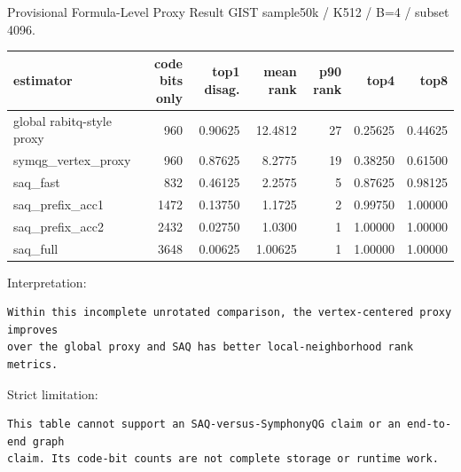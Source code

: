 \documentclass[aspectratio=169,10pt]{beamer}
\begin{document}
\begin{frame}[fragile]{Provisional Formula-Level Proxy Result}
\scriptsize
GIST sample50k / K512 / B=4 / subset 4096.

\begin{tabular}{lrrrrrr}
\toprule
estimator & code bits only & top1 disag. & mean rank & p90 rank & top4 & top8 \\
\midrule
global rabitq-style proxy & 960 & 0.90625 & 12.4812 & 27 & 0.25625 & 0.44625 \\
symqg\_vertex\_proxy & 960 & 0.87625 & 8.2775 & 19 & 0.38250 & 0.61500 \\
saq\_fast & 832 & 0.46125 & 2.2575 & 5 & 0.87625 & 0.98125 \\
saq\_prefix\_acc1 & 1472 & 0.13750 & 1.1725 & 2 & 0.99750 & 1.00000 \\
saq\_prefix\_acc2 & 2432 & 0.02750 & 1.0300 & 1 & 1.00000 & 1.00000 \\
saq\_full & 3648 & 0.00625 & 1.00625 & 1 & 1.00000 & 1.00000 \\
\bottomrule
\end{tabular}

\vspace{1em}
\small
Interpretation:
\begin{lstlisting}
Within this incomplete unrotated comparison, the vertex-centered proxy improves
over the global proxy and SAQ has better local-neighborhood rank metrics.
\end{lstlisting}

Strict limitation:
\begin{lstlisting}
This table cannot support an SAQ-versus-SymphonyQG claim or an end-to-end graph
claim. Its code-bit counts are not complete storage or runtime work.
\end{lstlisting}
\end{frame}
\end{document}
